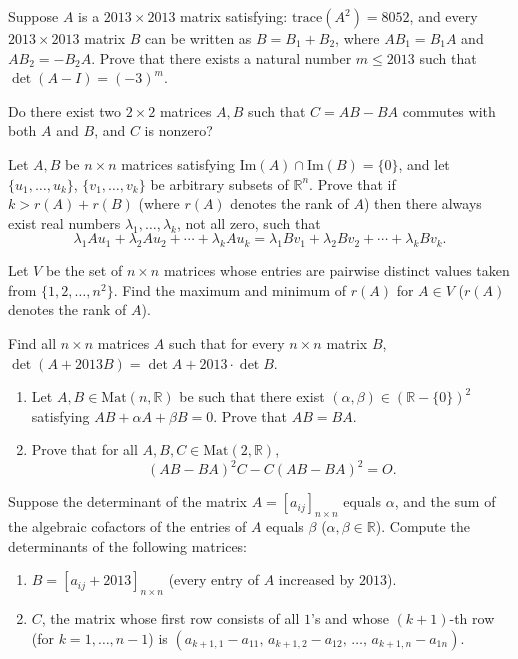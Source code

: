 \documentclass[12pt]{article}
\begin{document}
\begin{problem}
Suppose $A$ is a $2013\times 2013$ matrix satisfying: $\mathrm{trace}(A^2)=8052$, and every $2013\times 2013$ matrix $B$ can be written as $B=B_1+B_2$, where $AB_1=B_1A$ and $AB_2=-B_2A$. Prove that there exists a natural number $m\leq 2013$ such that $\det(A-I)=(-3)^m$.
\end{problem}

\begin{problem}
Do there exist two $2\times 2$ matrices $A,B$ such that $C=AB-BA$ commutes with both $A$ and $B$, and $C$ is nonzero?
\end{problem}

\begin{problem}
Let $A,B$ be $n\times n$ matrices satisfying $\mathrm{Im}(A)\cap\mathrm{Im}(B)=\{0\}$, and let $\{u_1,\dots,u_k\}$, $\{v_1,\dots,v_k\}$ be arbitrary subsets of $\mathbb{R}^n$. Prove that if $k > r(A)+r(B)$ (where $r(A)$ denotes the rank of $A$) then there always exist real numbers $\lambda_1,\dots,\lambda_k$, not all zero, such that
\[ \lambda_1Au_1+\lambda_2Au_2+\cdots+\lambda_kAu_k = \lambda_1Bv_1+\lambda_2Bv_2+\cdots+\lambda_kBv_k. \]
\end{problem}

\begin{problem}
Let $V$ be the set of $n\times n$ matrices whose entries are pairwise distinct values taken from $\{1,2,\dots,n^2\}$. Find the maximum and minimum of $r(A)$ for $A\in V$ ($r(A)$ denotes the rank of $A$).
\end{problem}

\begin{problem}
Find all $n\times n$ matrices $A$ such that for every $n\times n$ matrix $B$, $\det(A+2013B)=\det A + 2013\cdot\det B$.
\end{problem}

\begin{problem}
\begin{enumerate}[label=\arabic*.]
\item Let $A,B\in \mathrm{Mat}(n,\mathbb{R})$ be such that there exist $(\alpha,\beta)\in(\mathbb{R}-\{0\})^2$ satisfying $AB+\alpha A+\beta B=0$. Prove that $AB=BA$.
\item Prove that for all $A,B,C\in \mathrm{Mat}(2,\mathbb{R})$,
\[ (AB-BA)^2C - C(AB-BA)^2 = O. \]
\end{enumerate}
\end{problem}

\begin{problem}
Suppose the determinant of the matrix $A=[a_{ij}]_{n\times n}$ equals $\alpha$, and the sum of the algebraic cofactors of the entries of $A$ equals $\beta$ ($\alpha,\beta\in\mathbb{R}$). Compute the determinants of the following matrices:
\begin{enumerate}[label=\arabic*.]
\item $B = [a_{ij}+2013]_{n\times n}$ (every entry of $A$ increased by $2013$).
\item $C$, the matrix whose first row consists of all $1$'s and whose $(k+1)$-th row (for $k=1,\dots,n-1$) is $(a_{k+1,1}-a_{11},\, a_{k+1,2}-a_{12},\,\dots,\, a_{k+1,n}-a_{1n})$.
\end{enumerate}
\end{problem}
\end{document}
